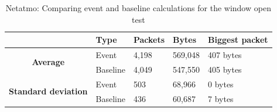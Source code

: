 \begin{table}[H]
    \centering
    \caption{Netatmo: Comparing event and baseline calculations for the window open test}
    \begin{tabular}{c|l|l|l|l|}
        \cline{2-5}
        \multicolumn{1}{l|}{}                                              & \textbf{Type} & \textbf{Packets} & \textbf{Bytes} & \textbf{Biggest packet} \\ \hline
        \multicolumn{1}{|c|}{\multirow{2}{*}{\textbf{Average}}}            & Event         & 4,198            & 569,048        & 407 bytes               \\ \cline{2-5} 
        \multicolumn{1}{|c|}{}                                             & Baseline      & 4,049            & 547,550        & 405 bytes                \\ \hline
        \multicolumn{1}{|c|}{\multirow{2}{*}{\textbf{Standard deviation}}} & Event         & 503              & 68,966         & 0 bytes                 \\ \cline{2-5} 
        \multicolumn{1}{|c|}{}                                             & Baseline      & 436              & 60,687         & 7 bytes               \\ \hline          
    \end{tabular}
    \label{tab:NetatmoComparingBaselineAndWindowCalculations}
\end{table}

